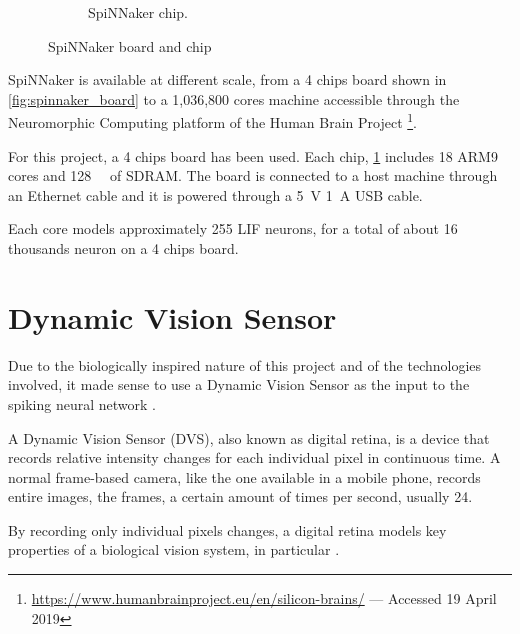 \begin{figure}[ht]
\begin{subfigure}{0.45\textwidth}
\caption{SpiNNaker chip.}
\label{fig:spinnaker_chip}
\end{subfigure}
\caption[SpiNNaker Board and Chip]{SpiNNaker board and chip}
\label{fig:spinnaker}
\end{figure}

SpiNNaker is available at different scale, from a 4 chips board shown in \cref{fig:spinnaker_board} to a 1,036,800 cores machine accessible through the Neuromorphic Computing platform of the Human Brain Project \footnote{\url{https://www.humanbrainproject.eu/en/silicon-brains/} --- Accessed 19 April 2019}.

For this project, a 4 chips board has been used. Each chip, \cref{fig:spinnaker_chip} includes 18 ARM9 cores and \SI{128}{\mega\byte} of SDRAM. The board is connected to a host machine through an Ethernet cable and it is powered through a \SI{5}{\volt} \SI{1}{\ampere} USB cable.

Each core models approximately 255 LIF neurons, for a total of about 16 thousands neuron on a 4 chips board.

\section{Dynamic Vision Sensor}
Due to the biologically inspired nature of this project and of the technologies involved, it made sense to use a Dynamic Vision Sensor as the input to the spiking neural network \cite{Hopkins2018}. 

A Dynamic Vision Sensor (DVS), also known as digital retina, is a device that records relative intensity changes for each individual pixel in continuous time. A normal frame-based camera, like the one available in a mobile phone, records entire images, the frames, a certain amount of times per second, usually 24. 

By recording only individual pixels changes, a digital retina models key properties of a biological vision system, in particular  \cite{Lichtsteiner2008}.

